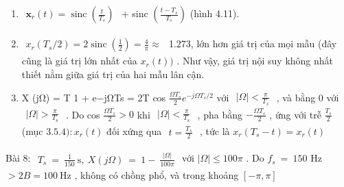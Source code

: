 \documentclass[
  10
]{article}
\begin{document}
\begin{enumerate}
\def\labelenumi{\alph{enumi}.}
\item
  \(\begin{array} { r } { \boldsymbol { x } _ { r } ( t ) = \operatorname { s i n c } \left( \frac { t } { T _ { s } } \right) } \end{array}\)
  + sinc
  \(\scriptstyle \left( { \frac { t - T _ { s } } { T _ { s } } } \right)\)
  (hình 4.11).
\item
  \(\begin{array} { r } { x _ { r } ( T _ { s } / 2 ) = 2 \operatorname { s i n c } \left( \frac { 1 } { 2 } \right) = \frac { 4 } { \pi } \approx } \end{array}\)
  1.273, lớn hơn giá trị của mọi mẫu (đây cũng là giá trị lớn nhất của
  \(x _ { r } ( t ) )\) . Như vậy, giá trị nội suy không nhất thiết nằm
  giữa giá trị của hai mẫu lân cận.
\item
  X (jΩ) = T 1 + e−jΩTs = 2T cos
  \(\frac { \Omega T _ { s } } { 2 } e ^ { - j \Omega T _ { s } / 2 }\)
  với
  \(\begin{array} { r } { | \Omega | < \frac { \pi } { T _ { s } } } \end{array}\)
  , và bằng 0 với
  \(\begin{array} { r } { | \Omega | > \frac { \pi } { T _ { \mathrm { s } } } } \end{array}\)
  . Do cos \(\frac { \Omega T _ { s } } { 2 } > 0\) khi
  \(\begin{array} { r } { | \Omega | < \frac { \pi } { T _ { \mathrm { s } } } } \end{array}\)
  , pha bằng \(- \frac { \Omega T _ { s } } { 2 }\) , ứng với trễ
  \(\scriptstyle { \frac { T _ { s } } { 2 } }\) (mục
  \(3 . 5 . 4 ) \colon x _ { r } ( t )\) đối xứng qua
  \(\begin{array} { r } { t = \frac { T _ { s } } { 2 } } \end{array}\)
  , tức là \(x _ { r } ( T _ { s } - t ) = x _ { r } ( t )\)
\end{enumerate}

Bài 8:
\(\begin{array} { r } { T _ { s } \ = \ \frac { 1 } { 1 5 0 } \ \mathrm { s } , \ X ( j \Omega ) \ = \ 1 - \ \frac { | \Omega | } { 1 0 0 \pi } } \end{array}\)
với \(| \Omega | \le 1 0 0 \pi\) . Do \(f _ { s } ~ = ~ 1 5 0\) Hz
\(> 2 B = 1 0 0 ~ \mathrm { H z }\) , không có chồng phổ, và trong
khoảng \([ - \pi , \pi ]\)
\end{document}
